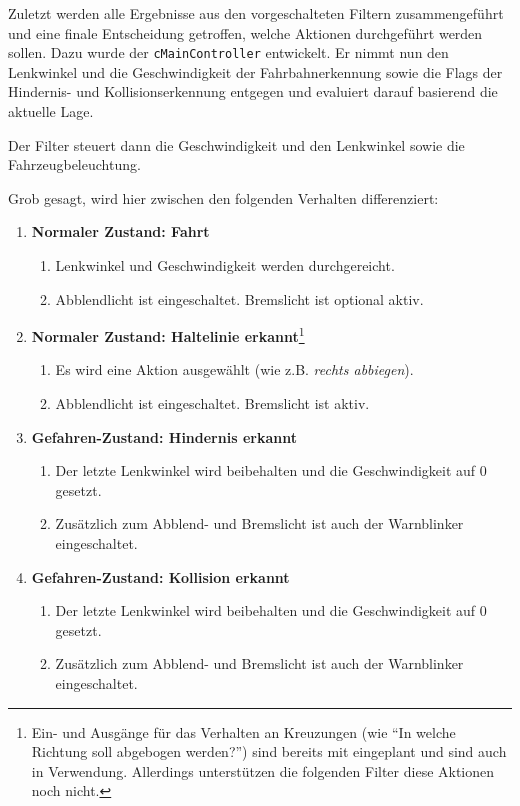 \documentclass[a4paper,12pt]{report}
\begin{document}
	Zuletzt werden alle Ergebnisse aus den vorgeschalteten Filtern zusammengeführt und eine finale Entscheidung getroffen, welche Aktionen durchgeführt werden sollen.
	Dazu wurde der \texttt{cMainController} entwickelt. Er nimmt nun den Lenkwinkel und die Geschwindigkeit der Fahrbahnerkennung sowie die Flags der Hindernis- und Kollisionserkennung entgegen und evaluiert darauf basierend die aktuelle Lage.

	Der Filter steuert dann die Geschwindigkeit und den Lenkwinkel sowie die Fahrzeugbeleuchtung.

	Grob gesagt, wird hier zwischen den folgenden Verhalten differenziert:

	\begin{enumerate}
		\item{\textbf{Normaler Zustand: Fahrt}
			\begin{enumerate}
				\item Lenkwinkel und Geschwindigkeit werden durchgereicht.
				\item Abblendlicht ist eingeschaltet. Bremslicht ist optional aktiv.
			\end{enumerate}
		}
		\item{\textbf{Normaler Zustand: Haltelinie erkannt}\footnote{Ein- und Ausgänge für das Verhalten an Kreuzungen (wie ``In welche Richtung soll abgebogen werden?'') sind bereits mit eingeplant und sind auch in Verwendung. Allerdings unterstützen die folgenden Filter diese Aktionen noch nicht.}
			\begin{enumerate}
				\item Es wird eine Aktion ausgewählt (wie z.B. \emph{rechts abbiegen}).
				\item Abblendlicht ist eingeschaltet. Bremslicht ist aktiv.
			\end{enumerate}
		}
		\item{\textbf{Gefahren-Zustand: Hindernis erkannt}
			\begin{enumerate}
				\item Der letzte Lenkwinkel wird beibehalten und die Geschwindigkeit auf $0$ gesetzt.
				\item Zusätzlich zum Abblend- und Bremslicht ist auch der Warnblinker eingeschaltet.
			\end{enumerate}
		}
		\item{\textbf{Gefahren-Zustand: Kollision erkannt}
			\begin{enumerate}
				\item Der letzte Lenkwinkel wird beibehalten und die Geschwindigkeit auf $0$ gesetzt.
				\item Zusätzlich zum Abblend- und Bremslicht ist auch der Warnblinker eingeschaltet.
			\end{enumerate}
		}
	\end{enumerate}
\end{document}
